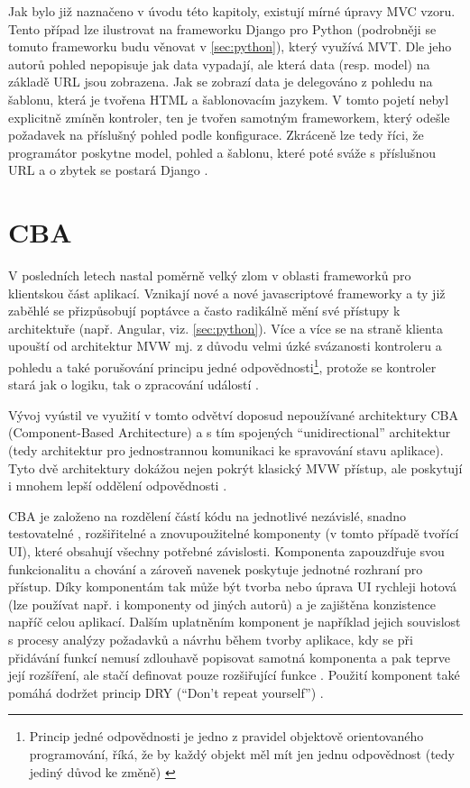     Jak bylo již naznačeno v úvodu této kapitoly, existují mírné úpravy MVC vzoru. Tento případ lze ilustrovat na frameworku Django pro Python (podrobněji se tomuto frameworku budu věnovat v \ref{sec:python}), který využívá MVT. Dle jeho autorů \cite{django-docs-mvp} pohled nepopisuje jak data vypadají, ale která data (resp. model) na základě URL jsou zobrazena. Jak se zobrazí data je delegováno z pohledu na šablonu, která je tvořena HTML a šablonovacím jazykem. V tomto pojetí nebyl explicitně zmíněn kontroler, ten je tvořen samotným frameworkem, který odešle požadavek na příslušný pohled podle konfigurace. Zkráceně lze tedy říci, že programátor poskytne model, pohled a šablonu, které poté sváže s příslušnou URL a o zbytek se postará Django \cite{django-mvp2}.
    
    \section{CBA}\label{cba}
    V posledních letech nastal poměrně velký zlom v oblasti frameworků pro klientskou část aplikací. Vznikají nové a nové javascriptové frameworky a ty již zaběhlé se přizpůsobují poptávce a často radikálně mění své přístupy k architektuře (např. Angular, viz. \ref{sec:python}). Více a více se na straně klienta upouští od architektur MVW mj. z důvodu velmi úzké svázanosti kontroleru a pohledu a také porušování principu jedné odpovědnosti\footnote{Princip jedné odpovědnosti je jedno z pravidel objektově orientovaného programování, říká, že by každý objekt měl mít jen jednu odpovědnost (tedy jediný důvod ke změně) \cite{single-responsibility}}, protože se kontroler stará jak o logiku, tak o zpracování událostí \cite{mvc-frontend}.
    
    Vývoj vyústil ve využití v tomto odvětví doposud nepoužívané architektury CBA (Component-Based Architecture) a s tím spojených \enquote{unidirectional} architektur (tedy architektur pro jednostrannou komunikaci ke spravování stavu aplikace). Tyto dvě architektury dokážou nejen pokrýt klasický MVW přístup, ale poskytují i mnohem lepší oddělení odpovědnosti \cite{mvc-frontend}.
    
    CBA je založeno na rozdělení částí kódu na jednotlivé nezávislé, snadno testovatelné \cite{cba3}, rozšiřitelné a znovupoužitelné komponenty (v tomto případě tvořící UI), které obsahují všechny potřebné závislosti. Komponenta zapouzdřuje svou funkcionalitu a chování a zároveň navenek poskytuje jednotné rozhraní pro přístup. Díky komponentám tak může být tvorba nebo úprava UI rychleji hotová (lze používat např. i komponenty od jiných autorů) a je zajištěna konzistence napříč celou aplikací. Dalším uplatněním komponent je například jejich souvislost s procesy analýzy požadavků a návrhu během tvorby aplikace, kdy se při přidávání funkcí nemusí zdlouhavě popisovat samotná komponenta a pak teprve její rozšíření, ale stačí definovat pouze rozšiřující funkce \cite{cba1}. Použití komponent také pomáhá dodržet princip DRY (\enquote{Don't repeat yourself}) \cite{cba2}.
    
